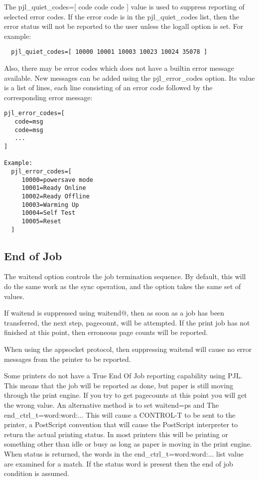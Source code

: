\documentclass[a4paper]{article}
\begin{document}
The
pjl\_quiet\_codes={[} code code code {]}
value is used to suppress reporting of selected error codes.
If the error code is in the pjl\_quiet\_codes list,  then the error status
will not be reported to the user unless the
{\ttfamily logall}
option is set.
For example:
\begin{tscreen}
\begin{verbatim}
  pjl_quiet_codes=[ 10000 10001 10003 10023 10024 35078 ]
\end{verbatim}
\end{tscreen}


Also, there may be error codes which does not have a builtin error
message available.  New messages can be added using the
{\ttfamily pjl\_error\_codes}
option.
Its value is a list of lines, each line consisting of an error code
followed by the corresponding error message:
\begin{tscreen}
\begin{verbatim}
pjl_error_codes=[
   code=msg
   code=msg
   ...
]

Example:
  pjl_error_codes=[
     10000=powersave mode
     10001=Ready Online
     10002=Ready Offline
     10003=Warming Up
     10004=Self Test
     10005=Reset
  ]
\end{verbatim}
\end{tscreen}



\subsection{End of Job
\label{waitend}
\label{waitend_interval}
\label{waitend_ctrl_t_interval}
\label{end_ctrl_t}}

The {\ttfamily waitend} option controls the job termination sequence.
By default,
this will do the same work as the
{\ttfamily sync} operation,
and the option takes the same set of values.

If {\ttfamily waitend}
is suppressed using {\ttfamily waitend@},
then as soon as a job has been transferred,
the next step,
{\ttfamily pagecount},
will be attempted.
If the print job has not finished at this point,
then erroneous page counts will be reported.

When using the {\ttfamily appsocket} protocol,
then suppressing {\ttfamily waitend} will cause no error messages from the printer to
be reported.

Some printers do not have a True End Of Job reporting capability
using PJL.
This means that the job will be reported as done,
but paper is still moving through the print engine.
If you try to get pagecounts at this point you will get the wrong value.
An alternative method is to set
{\ttfamily waitend=ps}
and
The {\ttfamily end\_ctrl\_t=word:word:...}
This will cause a CONTROL-T to be sent to the printer,
a PostScript convention that will cause the PostScript interpreter to return
the actual printing status.
In most printers this will be
{\ttfamily printing} or something other
than
{\ttfamily idle} or {\ttfamily busy}
as long as paper is moving in the print engine.
When status is returned,
the words in the
{\ttfamily end\_ctrl\_t=word:word:...}
list value are examined for a match.
If the status word is present then the end of job condition is assumed.
\end{document}
